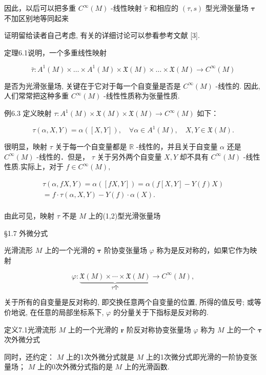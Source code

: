因此，以后可以把多重  $C^\infty (M)$  -线性映射  $\tilde{\tau}$  和相应的  $(\tau ,s)$  型光滑张量场  $\pmb{\tau}$  不加区别地等同起来

证明留给读者自己考虑, 有关的详细讨论可以参看参考文献 [3].

定理6.1说明，一个多重线性映射

$$
\bar {\tau}: A ^ {1} (M) \times \dots \times A ^ {1} (M) \times \mathfrak {X} (M) \times \dots \times \mathfrak {X} (M) \rightarrow C ^ {\infty} (M)
$$

是否为光滑张量场, 关键在于它对于每一个自变量是否是  $C^\infty(M)$ -线性的. 因此, 人们常常把这种多重  $C^\infty(M)$ -线性性质称为张量性质.

例6.3 定义映射  $\tau : A^1(M) \times \mathfrak{X}(M) \times \mathfrak{X}(M) \to C^\infty(M)$  如下：

$$
\tau (\alpha , X, Y) = \alpha ([ X, Y ]), \quad \forall \alpha \in A ^ {1} (M), \quad X, Y \in \mathfrak {X} (M).
$$

很明显，映射  $\tau$  关于每一个自变量都是  $\mathbb{R}$  -线性的，并且关于自变量  $\alpha$  还是  $C^\infty (M)$  -线性的．但是，  $\tau$  关于另外两个自变量  $X,Y$  却不具有 $C^\infty (M)$  -线性性质.实际上，对于  $f\in C^{\infty}(M),$

$$
\begin{array}{l} \tau (\alpha , f X, Y) = \alpha ([ f X, Y ]) = \alpha (f [ X, Y ] - Y (f) X) \\ = f \cdot \tau (\alpha , X, Y) - Y (f) \cdot \alpha (X). \\ \end{array}
$$

由此可见，映射  $\tau$  不是  $M$  上的(1,2)型光滑张量场

 §1.7 外微分式

光滑流形  $M$  上的一个光滑的  $\pmb{\tau}$  阶协变张量场  $\varphi$  称为是反对称的，如果它作为映射

$$
\varphi : \underbrace {\mathfrak {X} (M) \times \cdots \times \mathfrak {X} (M)} _ {\tau \text {个}} \to C ^ {\infty} (M),
$$

关于所有的自变量是反对称的, 即交换任意两个自变量的位置, 所得的值反号; 或等价地说, 在任意的局部坐标系下,  $\varphi$  的分量关于下指标是反对称的.

定义7.1光滑流形  $M$  上的一个光滑的  $\pmb{r}$  阶反对称协变张量场 $\varphi$  称为  $M$  上的一个  $\pmb{\tau}$  次外微分式

同时，还约定： $M$  上的1次外微分式就是  $M$  上的1次微分式即光滑的一阶协变张量场； $M$  上的0次外微分式指的是  $M$  上的光滑函数.

